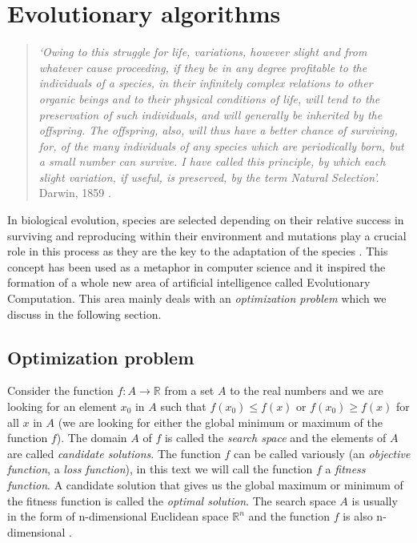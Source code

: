 \chapter{Evolutionary algorithms}
\begin{quotation}
\textit{‘Owing to this struggle for life, variations, however slight and from whatever cause proceeding, if they be in any degree profitable to the individuals of a species, in their infinitely complex relations to other organic beings and to their physical conditions of life, will tend to the preservation of such individuals, and will generally be inherited by the offspring. The offspring, also, will thus have a better chance of surviving, for, of the many individuals of any species which are periodically born, but a small number can survive. I have called this principle, by which each slight variation, if useful, is preserved, by the term Natural Selection’.} Darwin, 1859 \cite[p.40]{Darwin}.
\end{quotation}

In biological evolution, species are selected depending on their relative success in surviving and reproducing within their environment and mutations play a crucial role in this process as they are the key to the adaptation of the species \cite{natural-computing-algorithms}. This concept has been used as a metaphor in computer science and it inspired the formation of a whole new area of artificial intelligence called Evolutionary Computation. This area mainly deals with an \textit{optimization problem} which we discuss in the following section.

\section{Optimization problem}
Consider the function $f: A \to \mathbb{R}$ from a set $A$ to the real numbers and we are looking for an element $x_0$ in $A$ such that $f(x_0) \leq f(x)$ or $f(x_0) \geq f(x)$ for all $x$ in $A$ (we are looking for either the global minimum or maximum of the function $f$). The domain $A$ of $f$ is called the \textit{search space} and the elements of $A$ are called \textit{candidate solutions}. The function $f$ can be called variously (an \textit{objective function}, a \textit{loss function}), in this text we will call the function $f$ a \textit{fitness function}. A candidate solution that gives us the global maximum or minimum of the fitness function is called the \textit{optimal solution}. The search space $A$ is usually in the form of n-dimensional Euclidean space $\mathbb{R}^n$ and the function $f$ is also n-dimensional \cite{evolutionary-algorithms}.

